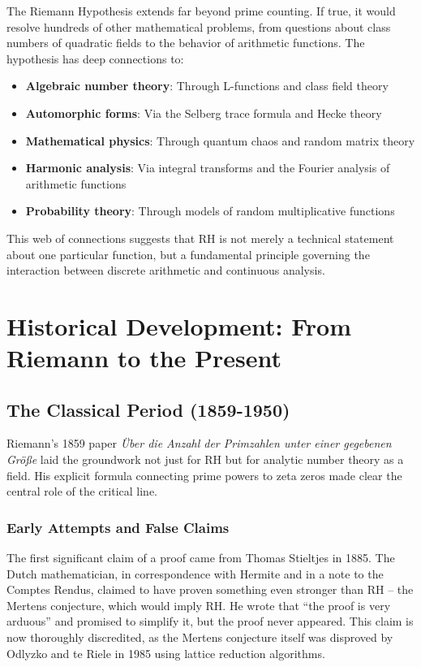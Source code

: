 The Riemann Hypothesis extends far beyond prime counting. If true, it would resolve hundreds of other mathematical problems, from questions about class numbers of quadratic fields to the behavior of arithmetic functions. The hypothesis has deep connections to:

\begin{itemize}
\item \textbf{Algebraic number theory}: Through L-functions and class field theory
\item \textbf{Automorphic forms}: Via the Selberg trace formula and Hecke theory
\item \textbf{Mathematical physics}: Through quantum chaos and random matrix theory
\item \textbf{Harmonic analysis}: Via integral transforms and the Fourier analysis of arithmetic functions
\item \textbf{Probability theory}: Through models of random multiplicative functions
\end{itemize}

This web of connections suggests that RH is not merely a technical statement about one particular function, but a fundamental principle governing the interaction between discrete arithmetic and continuous analysis.

\section*{Historical Development: From Riemann to the Present}

\subsection*{The Classical Period (1859-1950)}

Riemann's 1859 paper \emph{\"Uber die Anzahl der Primzahlen unter einer gegebenen Gr\"o{\ss}e} laid the groundwork not just for RH but for analytic number theory as a field. His explicit formula connecting prime powers to zeta zeros made clear the central role of the critical line.

\subsubsection*{Early Attempts and False Claims}

The first significant claim of a proof came from Thomas Stieltjes in 1885. The Dutch mathematician, in correspondence with Hermite and in a note to the Comptes Rendus, claimed to have proven something even stronger than RH -- the Mertens conjecture, which would imply RH. He wrote that ``the proof is very arduous'' and promised to simplify it, but the proof never appeared. This claim is now thoroughly discredited, as the Mertens conjecture itself was disproved by Odlyzko and te Riele in 1985 using lattice reduction algorithms.

